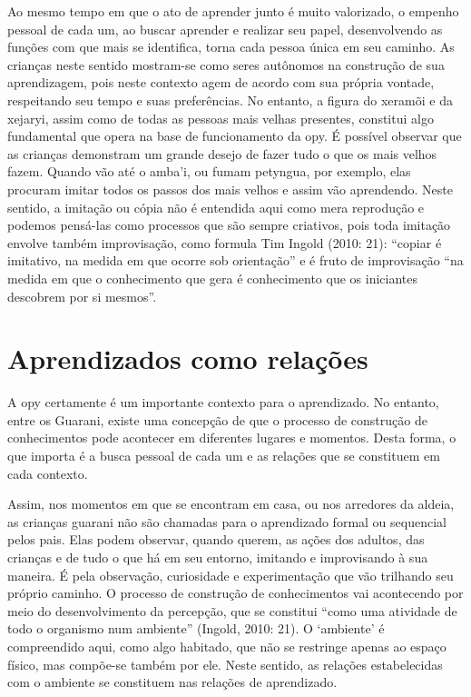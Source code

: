 Ao mesmo tempo em que o ato de aprender junto é muito valorizado, o
empenho pessoal de cada um, ao buscar aprender e realizar seu papel,
desenvolvendo as funções com que mais se identifica, torna cada pessoa
única em seu caminho. As crianças neste sentido mostram-se como seres
autônomos na construção de sua aprendizagem, pois neste contexto agem
de acordo com sua própria vontade, respeitando seu tempo e suas
preferências.  No entanto, a figura do xeramõi e da xejaryi, assim como
de todas as pessoas mais velhas presentes, constitui algo fundamental
que opera na base de funcionamento da opy. É possível observar que as
crianças demonstram um grande desejo de fazer tudo o que os mais velhos
fazem. Quando vão até o amba’i, ou fumam petyngua, por exemplo, elas
procuram imitar todos os passos dos mais velhos e assim vão aprendendo.
Neste sentido, a imitação ou cópia não é entendida aqui como mera
reprodução e podemos pensá-las como processos que são sempre criativos,
pois toda imitação envolve também improvisação, como formula Tim Ingold
(2010: 21): ``copiar é imitativo, na medida em que ocorre sob
orientação'' e é fruto de improvisação ``na medida em que o conhecimento
que gera é conhecimento que os iniciantes descobrem por si mesmos''.

\section{Aprendizados como relações}

A opy certamente é um importante contexto para o aprendizado. No
entanto, entre os Guarani, existe uma concepção de que o processo de
construção de conhecimentos pode acontecer em diferentes lugares e
momentos. Desta forma, o que importa é a busca pessoal de cada um e as
relações que se constituem em cada contexto. 

Assim, nos momentos em que se encontram em casa, ou nos arredores da
aldeia, as crianças guarani não são chamadas para o aprendizado formal
ou sequencial pelos pais. Elas podem observar, quando querem, as ações
dos adultos, das crianças e de tudo o que há em seu entorno, imitando e
improvisando à sua maneira. É pela observação, curiosidade e
experimentação que vão trilhando seu próprio caminho. O processo de
construção de conhecimentos vai acontecendo por meio do desenvolvimento
da percepção, que se constitui ``como uma atividade de todo o organismo
num ambiente'' (Ingold, 2010: 21). O ‘ambiente’ é compreendido aqui,
como algo habitado, que não se restringe apenas ao espaço físico, mas
compõe-se também por ele. Neste sentido, as relações estabelecidas com o
ambiente se constituem nas relações de aprendizado.


